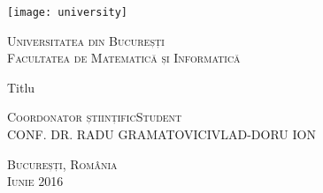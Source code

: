 \begin{titlepage}
	\begin{center}

		\texttt{[image: university]}

		\vspace{0.5cm}
		\LARGE \textsc{Universitatea din Bucureșți}
		\\
		\vspace{0.5cm}
		\Large \textsc{Facultatea de Matematică și Informatică}

		\vfill

		\Huge Titlu

		\vfill

		\Large
		\textsc{Coordonator științific}\hfill \textsc{Student}
		\\
		\large
		\uppercase{Conf. Dr. Radu Gramatovici}\hfill \uppercase{Vlad-Doru Ion}
	
		\vspace{1.5cm}
		\textsc{Bucureșți, România}\\
		\textsc{Iunie 2016}

	\end{center}
\end{titlepage}
 
